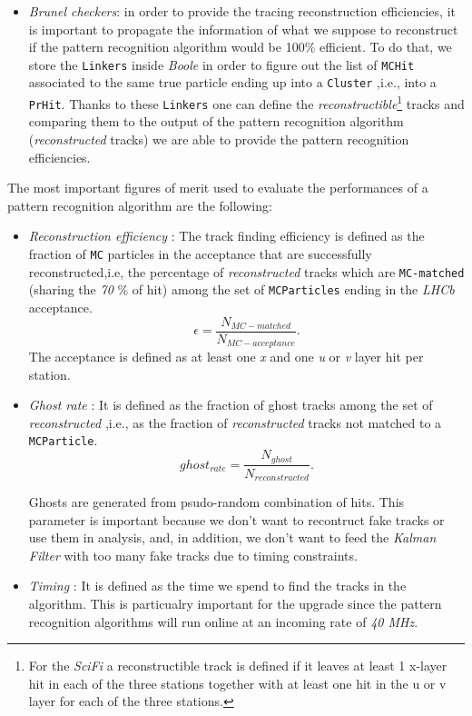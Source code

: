 \documentclass[paper=a4, fontsize=10pt]{scrartcl}
\numberwithin{equation}{section}		%
\numberwithin{figure}{section}			%
\numberwithin{table}{section}				%
\begin{document}
\begin{itemize}
\item{\textit{Brunel checkers}: in order to provide the tracing reconstruction efficiencies, it is important to propagate the information of what we suppose to reconstruct if the pattern recognition algorithm would be 100$\%$ efficient. To do that, we store the \texttt{Linkers} inside \textit{Boole} in order to figure out the list of \texttt{MCHit} associated to the same true particle ending up into a \texttt{Cluster} ,i.e.,  into a \texttt{PrHit}. Thanks to these \texttt{Linkers} one can define the \textit{reconstructible}\footnote{For the \textit{SciFi} a reconstructible track is defined if it leaves at least 1 x-layer hit in each of the three stations together with at least one hit in the u or v layer for each of the three stations.} tracks and comparing them to the output of the pattern recognition algorithm (\textit{reconstructed} tracks) we are able to provide the pattern recognition efficiencies.}
\end{itemize}

The most important figures of merit used to evaluate the performances of a pattern recognition algorithm are the following:
\begin{itemize}
 \item{\textit{Reconstruction efficiency} : The track finding efficiency is defined as the fraction of \texttt{MC} particles in the acceptance that are successfully reconstructed,i.e, the percentage of \textit{reconstructed} tracks which are \texttt{MC-matched} (sharing the \textit{70} $\%$ of hit) among the set of \texttt{MCParticles} ending in the \textit{LHCb} acceptance. $$\epsilon = \frac{N_{MC-matched}}{N_{MC-acceptance}}.$$
The acceptance is defined as at least one \textit{x} and one \textit{u} or \textit{v} layer hit per station.}
 \item{\textit{Ghost rate} : It is defined as the fraction of ghost tracks among the set of \textit{reconstructed} ,i.e., as the fraction of \textit{reconstructed} tracks not matched to a \texttt{MCParticle}.$$ghost_{rate} = \frac{N_{ghost}}{N_{reconstructed}}.$$

Ghosts are generated from psudo-random combination of hits. This parameter is important because we don't want to recontruct fake tracks or use them in analysis, and, in addition, we don't want to feed the \textit{Kalman Filter} with too many fake tracks due to timing constraints.}
 \item{\textit{Timing} : It is defined as the time we spend to find the tracks in the algorithm. This is particualry important for the upgrade since the pattern recognition algorithms will run online at an incoming rate of \textit{40 MHz}.}
\end{itemize}
\end{document}
